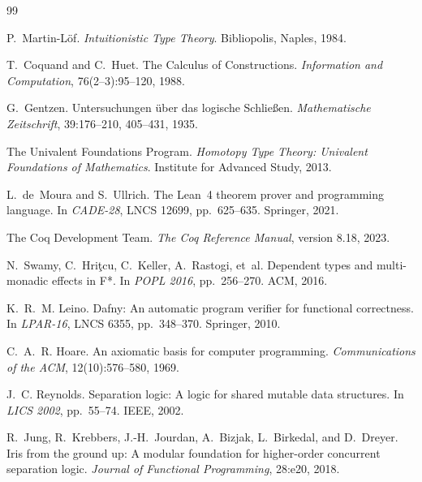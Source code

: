 \documentclass[11pt]{article}
\begin{document}

\begin{thebibliography}{99}

P.~Martin-L\"of.
\newblock \emph{Intuitionistic Type Theory}.
\newblock Bibliopolis, Naples, 1984.

T.~Coquand and C.~Huet.
\newblock The {Calculus of Constructions}.
\newblock \emph{Information and Computation}, 76(2--3):95--120, 1988.

G.~Gentzen.
\newblock Untersuchungen \"uber das logische {S}chlie{\ss}en.
\newblock \emph{Mathematische Zeitschrift}, 39:176--210, 405--431, 1935.

The Univalent Foundations Program.
\newblock \emph{Homotopy Type Theory: Univalent Foundations of Mathematics}.
\newblock Institute for Advanced Study, 2013.

L.~de~Moura and S.~Ullrich.
\newblock The {Lean~4} theorem prover and programming language.
\newblock In \emph{CADE-28}, LNCS 12699, pp.~625--635. Springer, 2021.

The Coq Development Team.
\newblock \emph{The {Coq} Reference Manual}, version 8.18, 2023.

N.~Swamy, C.~Hri\c{t}cu, C.~Keller, A.~Rastogi, et~al.
\newblock Dependent types and multi-monadic effects in {F*}.
\newblock In \emph{POPL 2016}, pp.~256--270. ACM, 2016.

K.~R.~M. Leino.
\newblock Dafny: An automatic program verifier for functional correctness.
\newblock In \emph{LPAR-16}, LNCS 6355, pp.~348--370. Springer, 2010.

C.~A.~R. Hoare.
\newblock An axiomatic basis for computer programming.
\newblock \emph{Communications of the ACM}, 12(10):576--580, 1969.

J.~C. Reynolds.
\newblock Separation logic: A logic for shared mutable data structures.
\newblock In \emph{LICS 2002}, pp.~55--74. IEEE, 2002.

R.~Jung, R.~Krebbers, J.-H.~Jourdan, A.~Bizjak, L.~Birkedal, and D.~Dreyer.
\newblock Iris from the ground up: A modular foundation for higher-order
  concurrent separation logic.
\newblock \emph{Journal of Functional Programming}, 28:e20, 2018.


\end{thebibliography}
\end{document}
